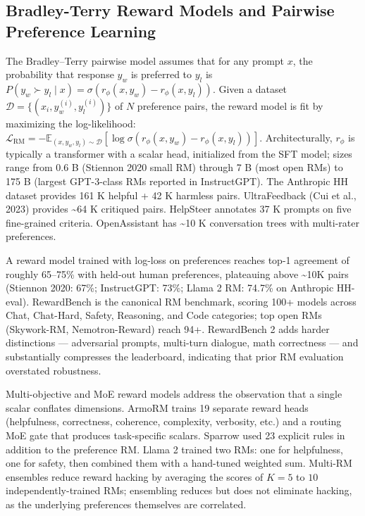 \documentclass{article}
\begin{document}
\subsection{Bradley-Terry Reward Models and Pairwise Preference Learning}\label{bradley-terry-reward-models-and-pairwise-preference-learning}

The Bradley--Terry pairwise model assumes that for any prompt \(x\), the probability that response \(y_w\) is preferred to \(y_l\) is \(P(y_w \succ y_l \mid x) = \sigma(r_\phi(x, y_w) - r_\phi(x, y_l))\). Given a dataset \(\mathcal{D} = \{(x_i, y_w^{(i)}, y_l^{(i)})\}\) of \(N\) preference pairs, the reward model is fit by maximizing the log-likelihood: \(\mathcal{L}_{\mathrm{RM}} = -\mathbb{E}_{(x, y_w, y_l) \sim \mathcal{D}}[\log \sigma(r_\phi(x, y_w) - r_\phi(x, y_l))]\). Architecturally, \(r_\phi\) is typically a transformer with a scalar head, initialized from the SFT model; sizes range from 0.6 B (Stiennon 2020 small RM) through 7 B (most open RMs) to 175 B (largest GPT-3-class RMs reported in InstructGPT). The Anthropic HH dataset \citep{bai20222022} provides 161 K helpful + 42 K harmless pairs. UltraFeedback (Cui et al., 2023) provides \textasciitilde64 K critiqued pairs. HelpSteer \citep{wang2024interpretableprefe} annotates 37 K prompts on five fine-grained criteria. OpenAssistant has \textasciitilde10 K conversation trees with multi-rater preferences.

A reward model trained with log-loss on preferences reaches top-1 agreement of roughly 65--75\% with held-out human preferences, plateauing above \textasciitilde10K pairs (Stiennon 2020: 67\%; InstructGPT: 73\%; Llama 2 RM: 74.7\% on Anthropic HH-eval). RewardBench \citep{lambert20242024} is the canonical RM benchmark, scoring 100+ models across Chat, Chat-Hard, Safety, Reasoning, and Code categories; top open RMs (Skywork-RM, Nemotron-Reward) reach 94+. RewardBench 2 \citep{malik20252025} adds harder distinctions --- adversarial prompts, multi-turn dialogue, math correctness --- and substantially compresses the leaderboard, indicating that prior RM evaluation overstated robustness.

Multi-objective and MoE reward models address the observation that a single scalar conflates dimensions. ArmoRM \citep{wang2024interpretableprefe} trains 19 separate reward heads (helpfulness, correctness, coherence, complexity, verbosity, etc.) and a routing MoE gate that produces task-specific scalars. Sparrow \citep{glaese20222022} used 23 explicit rules in addition to the preference RM. Llama 2 trained two RMs: one for helpfulness, one for safety, then combined them with a hand-tuned weighted sum. Multi-RM ensembles \citep{eisenstein20232023} reduce reward hacking by averaging the scores of \(K = 5\) to \(10\) independently-trained RMs; ensembling reduces but does not eliminate hacking, as the underlying preferences themselves are correlated.
\end{document}
